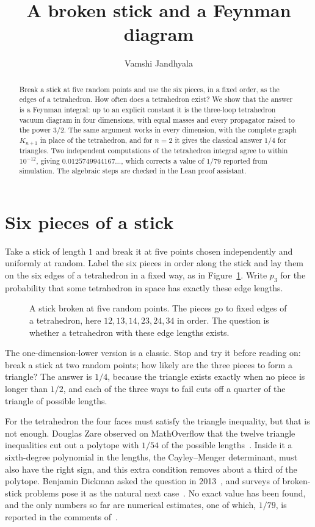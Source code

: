 \documentclass[11pt]{article}
\title{A broken stick and a Feynman diagram}
\author{Vamshi Jandhyala}
\date{}
\theoremstyle{remark}
\begin{document}
\maketitle
\vspace{-2em}

\begin{abstract}
Break a stick at five random points and use the six pieces, in a fixed order, as the edges of a
tetrahedron. How often does a tetrahedron exist? We show that the answer is a Feynman integral: up to an
explicit constant it is the three-loop tetrahedron vacuum diagram in four dimensions, with equal masses
and every propagator raised to the power $3/2$. The same argument works in every dimension, with the
complete graph $K_{n+1}$ in place of the tetrahedron, and for $n=2$ it gives the classical answer $1/4$ for
triangles. Two independent computations of the tetrahedron integral agree to within $10^{-12}$, giving
$0.0125749944167\ldots$, which corrects a value of $1/79$ reported from simulation. The algebraic steps are
checked in the Lean proof assistant.
\end{abstract}

\section{Six pieces of a stick}

Take a stick of length $1$ and break it at five points chosen independently and uniformly at random.
Label the six pieces in order along the stick and lay them on the six edges of a tetrahedron in a fixed
way, as in Figure~\ref{fig:stick}. Write $p_3$ for the probability that some tetrahedron in space has
exactly these edge lengths.

\begin{figure}[ht]
\centering

\caption{A stick broken at five random points. The pieces go to fixed edges of a tetrahedron, here
$12,13,14,23,24,34$ in order. The question is whether a tetrahedron with these edge lengths exists.}
\label{fig:stick}
\end{figure}

The one-dimension-lower version is a classic. Stop and try it before reading on: break a stick at two
random points; how likely are the three pieces to form a triangle? The answer is $1/4$, because the
triangle exists exactly when no piece is longer than $1/2$, and each of the three ways to fail cuts off
a quarter of the triangle of possible lengths.

For the tetrahedron the four faces must satisfy the triangle inequality, but that is not enough. Douglas
Zare observed on MathOverflow that the twelve triangle inequalities cut out a polytope with $1/54$ of the
possible lengths~\cite{Zare}. Inside it a sixth-degree polynomial in the lengths, the Cayley--Menger
determinant, must also have the right sign, and this extra condition removes about a third of the
polytope. Benjamin Dickman asked the question in 2013~\cite{MO,MSE}, and surveys of broken-stick
problems pose it as the natural next case~\cite{IP10,Ver22}. No exact value has been found, and the only numbers so far are numerical
estimates, one of which, $1/79$, is reported in the comments of~\cite{MO}.
\end{document}
